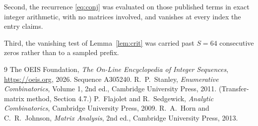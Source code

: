\documentclass[11pt,a4paper]{article}
\theoremstyle{plain}
\theoremstyle{definition}
\begin{document}
Second, the recurrence \eqref{eq:conj} was evaluated on those published terms in exact
integer arithmetic, with no matrices involved, and vanishes at every index the entry claims.

Third, the vanishing test of Lemma~\ref{lem:crit} was carried past $S=64$ consecutive
zeros rather than to a sampled prefix.

\begin{thebibliography}{9}
 The OEIS Foundation, \emph{The On-Line Encyclopedia of Integer
Sequences}, \url{https://oeis.org}, 2026. Sequence A305240.
 R.~P.~Stanley, \emph{Enumerative Combinatorics}, Volume 1, 2nd ed.,
Cambridge University Press, 2011. (Transfer-matrix method, Section 4.7.)
 P.~Flajolet and R.~Sedgewick, \emph{Analytic Combinatorics}, Cambridge
University Press, 2009.
 R.~A.~Horn and C.~R.~Johnson, \emph{Matrix Analysis}, 2nd ed., Cambridge
University Press, 2013.
\end{thebibliography}
\end{document}
